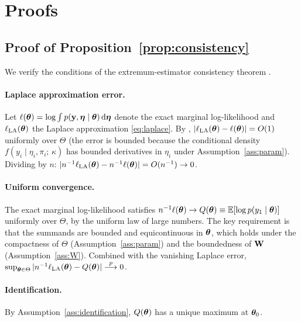 \section{Proofs}\label{app:proofs}

\subsection{Proof of Proposition~\ref{prop:consistency}}\label{app:proof_consistency}

We verify the conditions of the extremum-estimator consistency theorem \citep[Theorem~2.1]{newey_mcfadden1994}.

\paragraph{Laplace approximation error.}
Let $\ell(\boldsymbol{\theta}) = \log\int p(\mathbf{y},\boldsymbol{\eta}\mid\boldsymbol{\theta})\,\mathrm{d}\boldsymbol{\eta}$ denote the exact marginal log-likelihood and $\ell_{\mathrm{LA}}(\boldsymbol{\theta})$ the Laplace approximation \eqref{eq:laplace}.
By \citet{tierney_kadane1986}, $|\ell_{\mathrm{LA}}(\boldsymbol{\theta}) - \ell(\boldsymbol{\theta})| = O(1)$ uniformly over $\Theta$ (the error is bounded because the conditional density $f(y_i\mid\eta_i,\pi_i;\,\kappa)$ has bounded derivatives in $\eta_i$ under Assumption~\ref{ass:param}).
Dividing by $n$: $|n^{-1}\ell_{\mathrm{LA}}(\boldsymbol{\theta}) - n^{-1}\ell(\boldsymbol{\theta})| = O(n^{-1}) \to 0$.

\paragraph{Uniform convergence.}
The exact marginal log-likelihood satisfies $n^{-1}\ell(\boldsymbol{\theta}) \to Q(\boldsymbol{\theta}) \equiv \mathbb{E}[\log p(y_1\mid\boldsymbol{\theta})]$ uniformly over $\Theta$, by the uniform law of large numbers.
The key requirement is that the summands are bounded and equicontinuous in $\boldsymbol{\theta}$, which holds under the compactness of $\Theta$ (Assumption~\ref{ass:param}) and the boundedness of $\mathbf{W}$ (Assumption~\ref{ass:W}).
Combined with the vanishing Laplace error, $\sup_{\boldsymbol{\theta}\in\Theta}|n^{-1}\ell_{\mathrm{LA}}(\boldsymbol{\theta}) - Q(\boldsymbol{\theta})| \overset{p}{\longrightarrow} 0$.

\paragraph{Identification.}
By Assumption~\ref{ass:identification}, $Q(\boldsymbol{\theta})$ has a unique maximum at $\boldsymbol{\theta}_0$.

